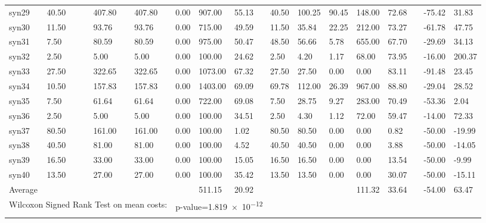 \begin{table}[H]
\begin{tabularx}{\textwidth}{XXlXXXXXlXXXXXlXX}
    syn29 & 40.50 && 407.80 & 407.80 & 0.00 & 907.00 & 55.13 && 40.50 & 100.25 & 90.45 & 148.00 & 72.68 && -75.42 & 31.83\\
    syn30 & 11.50 && 93.76 & 93.76 & 0.00 & 715.00 & 49.59 && 11.50 & 35.84 & 22.25 & 212.00 & 73.27 && -61.78 & 47.75\\
    syn31 & 7.50 && 80.59 & 80.59 & 0.00 & 975.00 & 50.47 && 48.50 & 56.66 & 5.78 & 655.00 & 67.70 && -29.69 & 34.13\\
    syn32 & 2.50 && 5.00 & 5.00 & 0.00 & 100.00 & 24.62 && 2.50 & 4.20 & 1.17 & 68.00 & 73.95 && -16.00 & 200.37\\
    syn33 & 27.50 && 322.65 & 322.65 & 0.00 & 1073.00 & 67.32 && 27.50 & 27.50 & 0.00 & 0.00 & 83.11 && -91.48 & 23.45\\
    syn34 & 10.50 && 157.83 & 157.83 & 0.00 & 1403.00 & 69.09 && 69.78 & 112.00 & 26.39 & 967.00 & 88.80 && -29.04 & 28.52\\
    syn35 & 7.50 && 61.64 & 61.64 & 0.00 & 722.00 & 69.08 && 7.50 & 28.75 & 9.27 & 283.00 & 70.49 && -53.36 & 2.04\\
    syn36 & 2.50 && 5.00 & 5.00 & 0.00 & 100.00 & 34.51 && 2.50 & 4.30 & 1.12 & 72.00 & 59.47 && -14.00 & 72.33\\
    syn37 & 80.50 && 161.00 & 161.00 & 0.00 & 100.00 & 1.02 && 80.50 & 80.50 & 0.00 & 0.00 & 0.82 && -50.00 & -19.99\\
    syn38 & 40.50 && 81.00 & 81.00 & 0.00 & 100.00 & 4.52 && 40.50 & 40.50 & 0.00 & 0.00 & 3.88 && -50.00 & -14.05\\
    syn39 & 16.50 && 33.00 & 33.00 & 0.00 & 100.00 & 15.05 && 16.50 & 16.50 & 0.00 & 0.00 & 13.54 && -50.00 & -9.99\\
    syn40 & 13.50 && 27.00 & 27.00 & 0.00 & 100.00 & 35.42 && 13.50 & 13.50 & 0.00 & 0.00 & 30.07 && -50.00 & -15.11\\
    \hline
    \multicolumn{2}{l}{Average} &&&&& 511.15 & 20.92 &&&&& 111.32 & 33.64 && -54.00 & 63.47\\
    \hline
    \multicolumn{5}{l}{Wilcoxon Signed Rank Test on mean costs:} & \multicolumn{9}{l}{p-value=\num{1.819e-12}}\\
        \lasthline
    \end{tabularx}
    \normalsize
\end{table}
